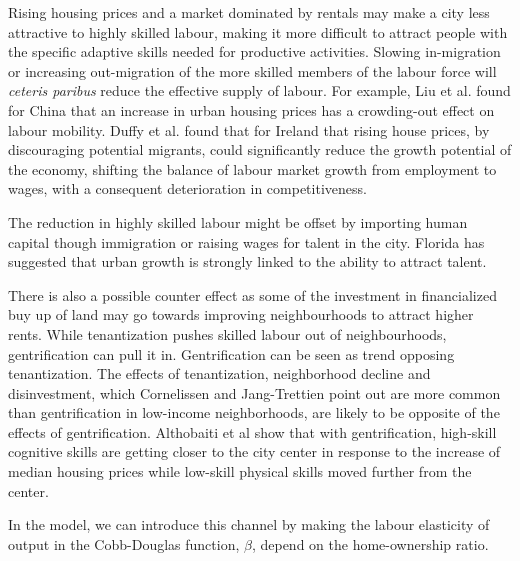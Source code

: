 Rising housing prices and a market dominated by rentals may make a city less attractive to highly skilled labour, making it more difficult to attract people with the specific adaptive skills needed for productive activities. %
Slowing in-migration or increasing out-migration of the more skilled members of the labour force will \textit{ceteris paribus} reduce the effective supply of labour. 
For example, Liu et al. \cite{liuImpactUrbanHousing2023} found for China that an increase in urban housing prices has a crowding-out effect on labour mobility.  Duffy et al.  \cite{duffyRisingHousePrices2005} found that for Ireland that rising house prices, by discouraging potential migrants, could significantly reduce the growth potential of the economy, shifting the balance of labour market growth from employment to wages, with a consequent deterioration in competitiveness. %


The reduction in highly skilled labour might be offset by importing human capital though immigration or raising wages for talent in the city. Florida\cite{floridaCompetingAgeTalent2005, floridaCreativeClassEconomic2014} has suggested that urban growth is strongly linked to the ability to attract talent. 


There is also a possible counter effect as some of the investment in financialized buy up of land may go towards improving neighbourhoods to attract higher rents.  
While tenantization pushes skilled labour out of neighbourhoods, gentrification can pull it in. Gentrification can be seen as trend opposing tenantization. The effects of tenantization, neighborhood decline and disinvestment, which Cornelissen and Jang-Trettien \cite{cornelissenHousingContextNeighborhood2023} point out are more common than gentrification in low-income neighborhoods, are likely to be opposite of the effects of gentrification. Althobaiti et al \cite{althobaitiHousingPricesSkills2021}  show that with gentrification, high-skill cognitive skills are getting closer to the city center in response to the increase of median housing prices while low-skill physical skills moved further from the center.  

In the model, we can introduce this channel by making the labour elasticity of output in the Cobb-Douglas function, $\beta$, depend on the home-ownership ratio.  


